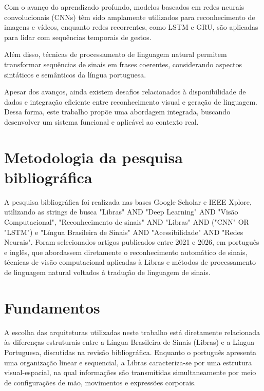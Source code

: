 \documentclass[
    12pt,                %
    openright,           %
    oneside,             %
    a4paper,             %
    english,             %
    brazil               %
]{abntex2}
\begin{document}
Com o avanço do aprendizado profundo, modelos baseados em redes neurais convolucionais (CNNs) têm sido amplamente utilizados para reconhecimento de imagens e vídeos, enquanto redes recorrentes, como LSTM e GRU, são aplicadas para lidar com sequências temporais de gestos.

Além disso, técnicas de processamento de linguagem natural permitem transformar sequências de sinais em frases coerentes, considerando aspectos sintáticos e semânticos da língua portuguesa. 

Apesar dos avanços, ainda existem desafios relacionados à disponibilidade de dados e integração eficiente entre reconhecimento visual e geração de linguagem. Dessa forma, este trabalho propõe uma abordagem integrada, buscando desenvolver um sistema funcional e aplicável ao contexto real.

\section{Metodologia da pesquisa bibliográfica}
\label{sec:metodologia_pesquisa}

A pesquisa bibliográfica foi realizada nas bases Google Scholar e IEEE Xplore, utilizando as strings de busca "Libras" AND "Deep Learning" AND "Visão Computacional", "Reconhecimento de sinais" AND "Libras" AND ("CNN" OR "LSTM") e "Língua Brasileira de Sinais" AND "Acessibilidade" AND "Redes Neurais". Foram selecionados artigos publicados entre 2021 e 2026, em português e inglês, que abordassem diretamente o reconhecimento automático de sinais, técnicas de visão computacional aplicadas à Libras e métodos de processamento de linguagem natural voltados à tradução de linguagem de sinais.


\section{Fundamentos}
\label{sec:fundamentos}

A escolha das arquiteturas utilizadas neste trabalho está diretamente relacionada às diferenças estruturais entre a Língua Brasileira de Sinais (Libras) e a Língua Portuguesa, discutidas na revisão bibliográfica. Enquanto o português apresenta uma organização linear e sequencial, a Libras caracteriza-se por uma estrutura visual-espacial, na qual informações são transmitidas simultaneamente por meio de configurações de mão, movimentos e expressões corporais.
\end{document}
